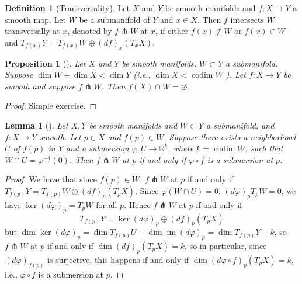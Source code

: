 \documentclass[reqno]{amsart}
\newtheorem{lemma}[theorem]{Lemma}
\newtheorem{proposition}[theorem]{Proposition}
\theoremstyle{definition}
\newtheorem{definition}[theorem]{Definition}
\theoremstyle{remark}
\DeclareMathOperator{\im}{im}
\DeclareMathOperator{\codim}{codim}
\begin{document}
\begin{definition}[Transversality]
    Let $X$ and $Y$ be smooth manifolds and
    $f \colon X \to Y$ a smooth map. Let
    $W$ be a submanifold of $Y$ and
    $x \in X$. Then $f$ intersects $W$ transversally
    at $x$, denoted by
    $f \pitchfork W $ at $x$, if either
    $f(x) \not\in W$ or
    $f(x) \in W$ and
    $T_{f(x)}Y = T_{f(x)} W \oplus
    \left( df \right)_x \left( T_x X \right) $.
\end{definition}

\begin{proposition}[]
    Let $X$ and $Y$ be smooth manifolds,
    $W \subset Y$ a submanifold. 
    Suppose $\dim W + \dim X < \dim Y$ (i.e.,
    $\dim X < \codim W$ ). Let
    $f \colon X \to Y$ be smooth and suppose 
    $f \pitchfork W$. Then
    $f(X) \cap W = \varnothing$.
\end{proposition}

\begin{proof}
    Simple exercise.
\end{proof}

\begin{lemma}[]\label{Transversality-Submersion}
    Let $X,Y$ be smooth manifolds and
    $W \subset Y$ a submanifold, and
    $f \colon X \to Y$ smooth. Let
    $p \in X$ and $f(p) \in W$. Suppose there
    exists a neighborhood $U$ of $f(p)$ in
    $Y$ and a submersion $\varphi \colon
    U \to \mathbb{R}^{k}$, where
    $k = \codim W$, such that
    $W \cap U = \varphi^{-1}(0)$. Then
    $f \pitchfork W$ at $p$ if and only if
    $\varphi \circ f$ is a submersion at $p$.
\end{lemma}

\begin{proof}
    We have that since
    $f(p) \in W$,
    $f \pitchfork W$ at $p$ if and only if
    $T_{f(p)} Y = T_{f(p)} W \oplus
    (df)_p \left( T_p X \right) $.
    Since
    $\varphi \left( W \cap U \right) 
    = 0$,
    $(d \varphi)_p T_pW = 0$, we have
    $\ker \left( d \varphi  \right)_p
    = T_p W$ for all $ p$.
    Hence $f \pitchfork W$ at $p$ if and only if
    \[
        T_{f(p)} Y =
        \ker \left( d \varphi  \right)_p 
        \oplus \left( df \right)_p \left( T_pX \right) 
    \] 
    but
    $\dim \ker \left( d \varphi  \right)_p 
    = \dim T_{f(p)} U - \dim
    \im \left( d \varphi  \right)_p
    = \dim T_{f(p)} Y - k$, so
    $f \pitchfork W$ at $p$ if and only if
    $\dim \left( df \right)_p \left( T_p X \right) 
    = k$, so in particular,
    since $\left( d \varphi  \right)_{f(p)}$ is surjective,
    this happens if and only if
    $\dim \left( d \varphi \circ f \right)_p 
    \left( T_p X \right) = k$, i.e., 
    $\varphi \circ f$ is a submersion at $p$.




\end{proof}
\end{document}
